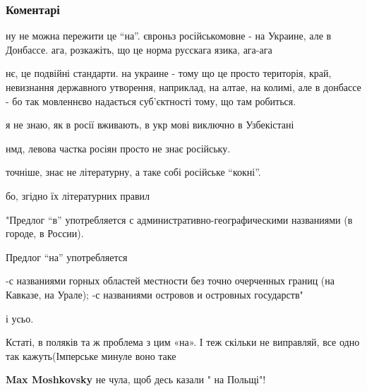  
 
 
 
 
\subsubsection{Коментарі}
\label{sec:10_12_2021.fb.gorovyj_ruslan.1.vna_ukraine.cmt}

\begin{itemize} %

ну не можна пережити це \enquote{на}. євроньз російськомовне - на Украине, але
в Донбассе. ага, розкажіть, що це норма русскага язика, ага-ага

\begin{itemize} %

нє, це подвійні стандарти. на украине - тому що це просто територія, край,
невизнання державного утворення, наприклад, на алтае, на колимі, але в донбассе
- бо так мовленнєво надається суб'єктності тому, що там робиться.

я не знаю, як в росії вживають, в укр мові виключно в Узбекістані


нмд, левова частка росіян просто не знає російську.

точніше, знає не літературну, а таке собі російське \enquote{кокні}.

бо, згідно їх літературних правил

"Предлог \enquote{в} употребляется с административно-географическими названиями (в городе, в России).

Предлог \enquote{на} употребляется

-с названиями горных областей местности без точно очерченных границ (на Кавказе, на Урале);
-с названиями островов и островных государств"

і усьо.
\end{itemize} %


Кстаті, в поляків та ж проблема з цим «на». І теж скільки не виправляй, все
одно так кажуть(Імперське минуле воно таке

\begin{itemize} %
\textbf{Max Moshkovsky} не чула, щоб десь казали " на Польщі"!


\end{itemize}
\end{itemize}
